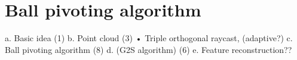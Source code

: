 
\chapter{Ball pivoting algorithm}
a.	Basic idea (1)
b.	Point cloud (3)
•	Triple orthogonal raycast, (adaptive?)
c.	Ball pivoting algorithm (8)
d.	(G2S algorithm) (6)
e.	 Feature reconstruction??
